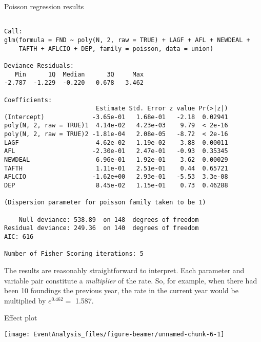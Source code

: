 \documentclass[10pt,ignorenonframetext,]{beamer}
\begin{document}
\begin{frame}[fragile]{Poisson regression results}

\tiny

\begin{verbatim}

Call:
glm(formula = FND ~ poly(N, 2, raw = TRUE) + LAGF + AFL + NEWDEAL + 
    TAFTH + AFLCIO + DEP, family = poisson, data = union)

Deviance Residuals: 
   Min      1Q  Median      3Q     Max  
-2.787  -1.229  -0.220   0.678   3.462  

Coefficients:
                         Estimate Std. Error z value Pr(>|z|)
(Intercept)             -3.65e-01   1.68e-01   -2.18  0.02941
poly(N, 2, raw = TRUE)1  4.14e-02   4.23e-03    9.79  < 2e-16
poly(N, 2, raw = TRUE)2 -1.81e-04   2.08e-05   -8.72  < 2e-16
LAGF                     4.62e-02   1.19e-02    3.88  0.00011
AFL                     -2.30e-01   2.47e-01   -0.93  0.35345
NEWDEAL                  6.96e-01   1.92e-01    3.62  0.00029
TAFTH                    1.11e-01   2.51e-01    0.44  0.65721
AFLCIO                  -1.62e+00   2.93e-01   -5.53  3.3e-08
DEP                      8.45e-02   1.15e-01    0.73  0.46288

(Dispersion parameter for poisson family taken to be 1)

    Null deviance: 538.89  on 148  degrees of freedom
Residual deviance: 249.36  on 140  degrees of freedom
AIC: 616

Number of Fisher Scoring iterations: 5
\end{verbatim}

\normalsize
The results are reasonably straightforward to interpret. Each parameter
and variable pair constitute a \emph{multiplier} of the rate. So, for
example, when there had been 10 foundings the previous year, the rate in
the current year would be multiplied by \(e^{0.462}=\) 1.587.

\end{frame}

\begin{frame}{Effect plot}

\begin{center}\texttt{[image: EventAnalysis\_files/figure-beamer/unnamed-chunk-6-1]} \end{center}

\end{frame}
\end{document}
